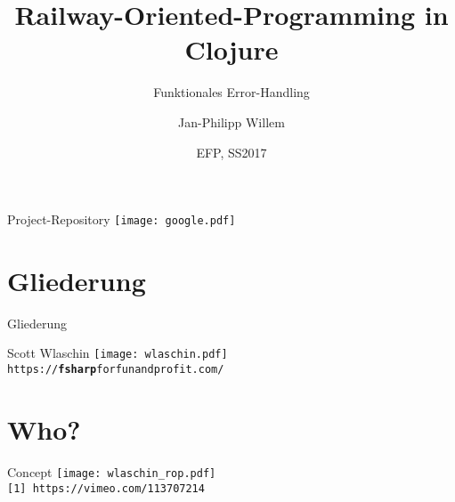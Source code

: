 \documentclass[compress]{beamer}
\title{Railway-Oriented-Programming \break in Clojure}
\subtitle{Funktionales Error-Handling}
\author{Jan-Philipp Willem}
\institute{Fakultät für Informatik\\Hochschule Mannheim}
\date{EFP, SS2017}
\begin{document}

\maketitle

\begin{frame}{Project-Repository}
  \texttt{[image: google.pdf]}
  \\[20pt]
\end{frame}

\section*{Gliederung}
\begin{frame}{Gliederung}
  \tableofcontents[hideallsubsections]
\end{frame}

\begin{frame}{Scott Wlaschin}
  \setcounter{framenumber}{1}
  \texttt{[image: wlaschin.pdf]}
  \\[4pt]
  {\tt https://\textbf{fsharp}forfunandprofit.com/}
\end{frame}

\section["`Well, I Suppose you don't need to know about monads. You only need to use 'Maybe' --~Maybe What? -- 'Maybe' the monad. -- Maybe the monad what? -- Now I think about it. 'Either' might be better... --~Either what?"' \small{(Scott~Wlaschin,~NDC~Conference~2014) [1]}]{Who?}

\begin{frame}{Concept}
  \setcounter{framenumber}{3}
  \texttt{[image: wlaschin\_rop.pdf]}
  \\[4pt]
  \texttt{[1] https://vimeo.com/113707214}
\end{frame}
\end{document}
